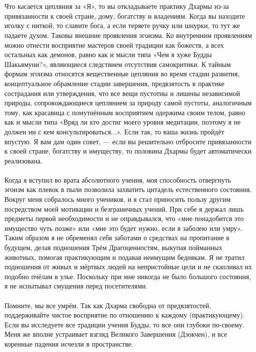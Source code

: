 \\ \\ Что касается цепляния за «Я», то вы откладываете практику Дхармы из-за привязанности к своей стране, дому, богатству и владениям. Когда вы находите иголку с ниткой, то славите бога, а если теряете ручку или шнурки, то тут же падаете духом. Таковы внешние проявления эгоизма. Ко внутренним проявлениям можно отнести восприятие мастеров своей традиции как божеств, а всех остальных как демонов, равно как и мысли типа «Чем я хуже Будды Шакьямуни?», являющиеся следствием отсутствия самокритики. К тайным формам эгоизма относятся вещественные цепляния во время стадии развития, концептуальное обрамление стадии завершения, предвзятость в практике сострадания или утверждения, что все вещи пустотны и лишены независимой природы, сопровождающиеся цеплянием за природу самой пустоты, аналогичным тому, как красавица с помутнённым восприятием одержима своим телом, равно как и мысли типа «Вряд ли кто достиг моего уровня медитации, поэтому я не должен ни с кем консультироваться...». Если так, то ваша жизнь пройдёт впустую. Я вам дам один совет, — если вы решительно отбросите привязанности к своей стране, богатству и имуществу, то половина Дхармы будет автоматически реализована.
\\ \\ Когда я вступил во врата абсолютного учения, моя способность отвергнуть эгоизм как плевок в пыли позволила захватить цитадель естественного состояния. Вокруг меня собралось много учеников, и я стал приносить пользу другим посредством моей мотивации и безграничных учений. При себе я держал лишь предметы первой необходимости и не оправдывался, что «мне понадобится это имущество чуть позже» или «мне это будет нужно, если я заболею или умру». Таким образом я не обременял себя заботами о средствах на пропитание в будущем, делая подношения Трём Драгоценностям, выкупая пойманных животных, помогая практикующим и подавая неимущим беднякам. Я не тратил подношения от живых и мёртвых людей на непристойные цели и не скапливал их подобно пчёлам в улье. Поскольку при мне никогда не было большого состояния, я не испытывал смущения перед посетителями.
\\ \\ Помните, мы все умрём. Так как Дхарма свободна от предвзятостей, поддерживайте чистое восприятие по отношению к каждому (практикующему). Если вы исследуете все традиции учения Будды, то все они глубоки по-своему. Меня же вполне устраивает взгляд Великого Завершения (Дзокчен), и все коренные падения исчезли в пространстве.

